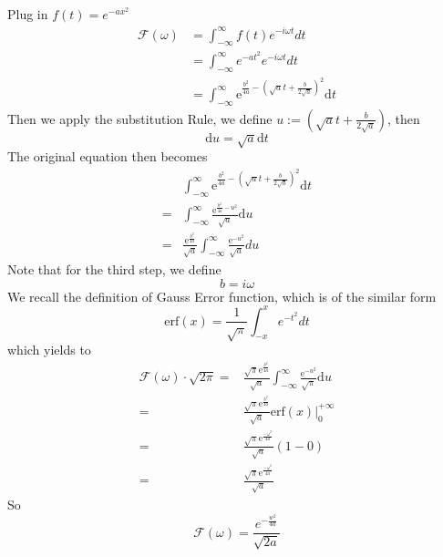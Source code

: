 \documentclass{article}
\begin{document}
\subsection{}
Plug in $f(t) = e^{-a x^{2}}$
\begin{align*}
	\mathcal{F}(\omega)&=\int_{-\infty}^{\infty} f(t) e^{-i \omega t} d t \\ 
	&= \int_{-\infty}^{\infty} e^{-a t^{2}} e^{-i \omega t} d t \\ 
	&= \int_{-\infty}^{\infty} \mathrm{e}^{\frac{b^{2}}{4 a}-\left(\sqrt{a} t+\frac{b}{2 \sqrt{a}}\right)^{2}} \mathrm{d} t
\end{align*}
Then we apply the substitution Rule, we define $u:= (\sqrt{a} t+\frac{b}{2 \sqrt{a}})$, then 
\[
	\mathrm{d} u = \sqrt{a}\mathrm{d}t
\]
The original equation then becomes
\begin{align*}
	&\int_{-\infty}^{\infty} \mathrm{e}^{\frac{b^{2}}{4 a}-\left(\sqrt{a} t+\frac{b}{2 \sqrt{a}}\right)^{2}} \mathrm{d} t \\
	=&\int_{-\infty}^{\infty} \frac{\mathrm{e}^{\frac{b^{2}}{4 a}-u^{2}} }{\sqrt{a}}\mathrm{d}u\\
	=&\frac{\mathrm{e}^{\frac{b^{2}}{4 a}}}{\sqrt{a}}\int_{-\infty}^{\infty} \frac{\mathrm{e}^{-u^{2}}}{\sqrt{a}} du
\end{align*} 
Note that for the third step, we define
\[
	b = i \omega
\]
We recall the definition of Gauss Error function, which is of the similar form
\[
	\mathrm{erf}(x) = \frac{1}{\sqrt{\pi}} \int_{-x}^{x} e^{-t^{2}} d t
\]
which yields to
\begin{align*}
	\mathcal{F}( \omega)\cdot \sqrt{2\pi} =&\frac{\sqrt{\pi} \mathrm{e}^{\frac{b^{2}}{4 a}}}{ \sqrt{a}} \int_{-\infty}^{\infty} \frac{ \mathrm{e}^{-u^{2}}}{\sqrt{\pi}} \mathrm{d} u\\
	=& \frac{\sqrt{\pi} \mathrm{e}^{\frac{b^{2}}{4 a}}}{ \sqrt{a}} \mathrm{erf}(x)|_{0}^{+\infty}\\
	=&\frac{\sqrt{\pi} \mathrm{e}^{\frac{-\omega^2}{4 a}}}{ \sqrt{a}} (1-0)\\
	=&\frac{\sqrt{\pi} \mathrm{e}^{\frac{-\omega^2}{4 a}}}{\sqrt{a}}
\end{align*}
So 
\[
	\mathcal{F}( \omega)=\frac{e^{-\frac{w^{2}}{4 a}}}{\sqrt{2a}}
\]
\end{document}
